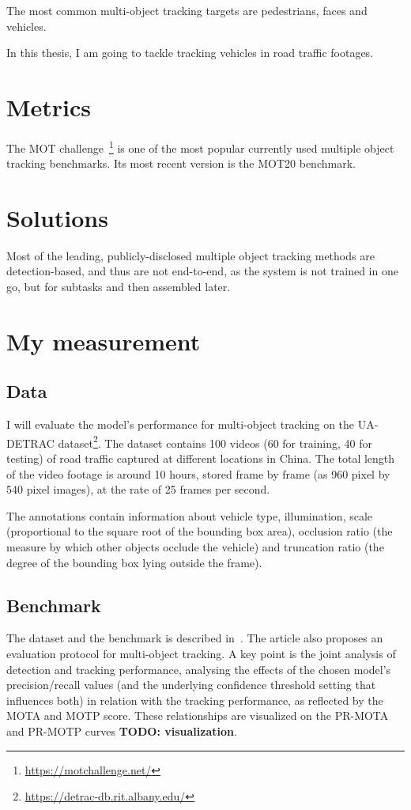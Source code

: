 The most common multi-object tracking targets are pedestrians, faces and vehicles. 

In this thesis, I am going to tackle tracking vehicles in road traffic footages.

\section{Metrics}

The MOT challenge~\footnote{\url{https://motchallenge.net/}} is one of the most popular currently used multiple object tracking benchmarks. Its most recent version is the MOT20 benchmark.

\section{Solutions}

Most of the leading, publicly-disclosed multiple object tracking methods are detection-based, and thus are not end-to-end, as the system is not trained in one go, but for subtasks and then assembled later.

\section{My measurement}
\subsection{Data}

I will evaluate the model's performance for multi-object tracking on the UA-DETRAC dataset\footnote{\url{https://detrac-db.rit.albany.edu/}}. The dataset contains 100 videos (60 for training, 40 for testing) of road traffic captured at different locations in China. The total length of the video footage is around 10 hours, stored frame by frame (as 960 pixel by 540 pixel images), at the rate of 25 frames per second.

The annotations contain information about vehicle type, illumination, scale (proportional to the square root of the bounding box area), occlusion ratio (the measure by which other objects occlude the vehicle) and truncation ratio (the degree of the bounding box lying outside the frame). 

\subsection{Benchmark}

The dataset and the benchmark is described in~\cite{CVIU_UA-DETRAC}. The article also proposes an evaluation protocol for multi-object tracking. A key point is the joint analysis of detection and tracking performance, analysing the effects of the chosen model's precision/recall values (and the underlying confidence threshold setting that influences both) in relation with the tracking performance, as reflected by the MOTA and MOTP score. These relationships are visualized on the PR-MOTA and PR-MOTP curves \textbf{TODO: visualization}.

